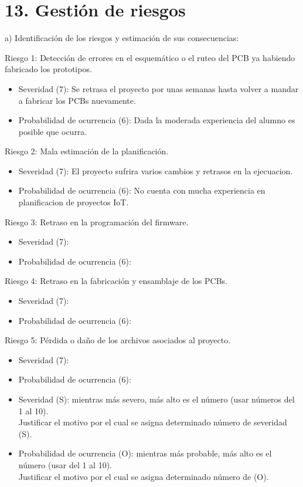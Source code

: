 \documentclass[
11pt, %
codirector, %
]{charter}
\begin{document}
\section{13. Gestión de riesgos}
\label{sec:riesgos}
a) Identificación de los riesgos y estimación de sus consecuencias:

Riesgo 1: Detección de errores en el esquemático o el ruteo del PCB ya habiendo fabricado los prototipos.
\begin{itemize}
	\item Severidad (7): Se retrasa el proyecto por unas semanas hasta volver a mandar a fabricar los PCBs nuevamente.
	\item Probabilidad de ocurrencia (6): Dada la moderada experiencia del alumno es posible que ocurra.
\end{itemize}  

Riesgo 2: Mala estimación de la planificación.
\begin{itemize}
	\item Severidad (7): El proyecto sufrira varios cambios y retrasos en la ejecuacion.
	\item Probabilidad de ocurrencia (6): No cuenta con mucha experiencia en planificacion de proyectos IoT.
\end{itemize}

Riesgo 3: Retraso en la programación del firmware.
\begin{itemize}
	\item Severidad (7): 
	\item Probabilidad de ocurrencia (6): 
\end{itemize}  

Riesgo 4: Retraso en la fabricación y ensamblaje de los PCBs.
\begin{itemize}
	\item Severidad (7): 
	\item Probabilidad de ocurrencia (6): 
\end{itemize}

Riesgo 5: Pérdida o daño de los archivos asociados al proyecto.
\begin{itemize}
	\item Severidad (7): 
	\item Probabilidad de ocurrencia (6): 
\end{itemize}  




\begin{itemize}
	\item Severidad (S): mientras más severo, más alto es el número (usar números del 1 al 10).\\
	Justificar el motivo por el cual se asigna determinado número de severidad (S).
	\item Probabilidad de ocurrencia (O): mientras más probable, más alto es el número (usar del 1 al 10).\\
	Justificar el motivo por el cual se asigna determinado número de (O). 
\end{itemize}  
\end{document}
